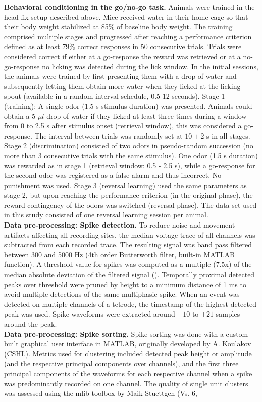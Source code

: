 \begin{framed}
\textbf{Behavioral conditioning in the go/no-go task.} Animals were trained in the head-fix setup described above. Mice received water in their home cage so that their body weight stabilized at 85$\%$ of baseline body weight. The training comprised multiple stages and progressed after reaching a performance criterion defined as at least 79$\%$ correct responses in 50 consecutive trials. Trials were considered correct if either at a go-response the reward was retrieved or at a no-go-response no licking was detected during the lick window. In the initial sessions, the animals were trained by first presenting them with a drop of water and subsequently letting them obtain more water when they licked at the licking spout (available in a random interval schedule, 0.5-12 seconds). Stage 1 (training): A single odor (1.5 s stimulus duration) was presented. Animals could obtain a 5 $\mu l$ drop of water if they licked at least three times during a window from 0 to 2.5 s after stimulus onset (retrieval window), this was considered a go-response. The interval between trials was randomly set at $10\pm 2$ s in all stages. Stage 2 (discrimination) consisted of two odors in pseudo-random succession (no more than 3 consecutive trials with the same stimulus). One odor (1.5 s duration) was rewarded as in stage 1 (retrieval window: 0.5 - 2.5 s), while a go-response for the second odor was registered as a false alarm and thus incorrect. No punishment was used. Stage 3 (reversal learning) used the same parameters as stage 2, but upon reaching the performance criterion (in the original phase), the reward contingency of the odors was switched (reversal phase). The data set used in this study consisted of one reversal learning session per animal.\\\textbf{Data pre-processing: Spike detection.} To reduce noise and movement artifacts affecting all recording sites, the median voltage trace of all channels was subtracted from each recorded trace. The resulting signal was band pass filtered between 300 and 5000 Hz (4th order Butterworth filter, built-in MATLAB function). A threshold value for spikes was computed as a multiple (7.5x) of the median absolute deviation of the filtered signal (\cite{Quiroga}). Temporally proximal detected peaks over threshold were pruned by height to a minimum distance of 1 ms to avoid multiple detections of the same multiphasic spike. When an event was detected on multiple channels of a tetrode, the timestamp of the highest detected peak was used. Spike waveforms were extracted around $-10$ to $+21$ samples around the peak.\\\textbf{Data pre-processing: Spike sorting.} Spike sorting was done with a custom-built graphical user interface in MATLAB, originally developed by A. Koulakov (CSHL). Metrics used for clustering included detected peak height or amplitude (and the respective principal components over channels), and the first three principal components of the waveforms for each respective channel when a spike was predominantly recorded on one channel. The quality of single unit clusters was assessed using the mlib toolbox by Maik Stuettgen (Vs. 6, 
\end{framed}
